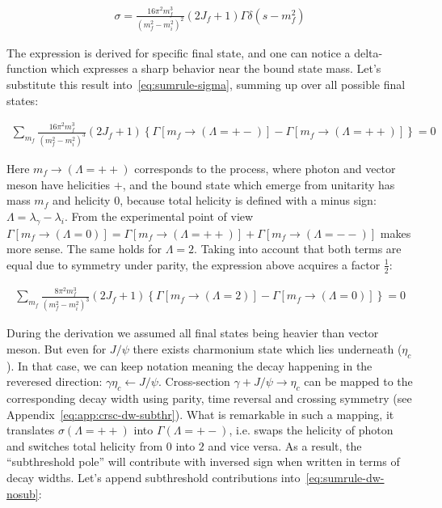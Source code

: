 \begin{align} \label{eq:crsc-dw}
    \sigma = \frac{16 \pi^2 m_f^3}{(m_f^2 - m_i^2)^2} (2J_f + 1) \Gamma \delta(s - m_f^2)
\end{align}

The expression is derived for specific final state, and one can notice a delta-function which expresses a sharp behavior near the bound state mass. Let's substitute this result into~\cref{eq:sumrule-sigma}, summing up over all possible final states:

\begin{align}
    \sum_{m_f} \frac{16 \pi^2 m_f^3}{(m_f^2 - m_i^2)^3} (2J_f+1) \left\{ \Gamma\left[m_f \rightarrow (\Lambda = +-)\right] - \Gamma\left[m_f \rightarrow (\Lambda = ++)\right] \right\} = 0
\end{align}

Here $m_f \rightarrow (\Lambda = ++)$ corresponds to the process, where photon and vector meson have helicities $+$, and the bound state which emerge from unitarity has mass $m_f$ and helicity $0$, because total helicity is defined with a minus sign: $\Lambda = \lambda_\gamma - \lambda_i$. From the experimental point of view $\Gamma\left[m_f \rightarrow (\Lambda=0)\right] = \Gamma\left[m_f \rightarrow (\Lambda = ++)\right] + \Gamma\left[m_f \rightarrow (\Lambda = --)\right]$ makes more sense. The same holds for $\Lambda=2$. Taking into account that both terms are equal due to symmetry under parity, the expression above acquires a factor $\frac{1}{2}$:


\begin{align} \label{eq:sumrule-dw-nosub}
    \sum_{m_f} \frac{8 \pi^2 m_f^3}{(m_f^2 - m_i^2)^3} (2J_f+1) \left\{\Gamma\left[m_f \rightarrow (\Lambda = 2)\right] - \Gamma\left[m_f \rightarrow (\Lambda = 0)\right] \right\} = 0
\end{align}

During the derivation we assumed all final states being heavier than vector meson. But even for $J/\psi$ there exists charmonium state which lies underneath ($\eta_c$). In that case, we can keep notation meaning the decay happening in the reveresed direction: $\gamma \eta_c \leftarrow J/\psi$. Cross-section $\gamma + J/\psi \rightarrow \eta_c$ can be mapped to the corresponding decay width using parity, time reversal and crossing symmetry (see Appendix~\cref{eq:app:crsc-dw-subthr}). What is remarkable in such a mapping, it translates $\sigma(\Lambda=++)$ into $\Gamma(\Lambda=+-)$, i.e. swaps the helicity of photon and switches total helicity from $0$ into $2$ and vice versa. As a result, the ``subthreshold pole'' will contribute with inversed sign when written in terms of decay widths. Let's append subthreshold contributions into~\cref{eq:sumrule-dw-nosub}:

